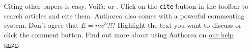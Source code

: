 Citing other papers is easy. Voilà: \cite{2012} or \cite{Holstein_2009}. Click on the \verb|cite| button\cite{Szpyrka_2013} in the toolbar to search articles and cite them. Authorea also comes with a powerful commenting system. Don't agree that $E  =  mc^{3}$?!? Highlight the text you want to discuss or click the comment button. Find out more about using Authorea on \href{https://www.authorea.com/help}{our help page}.